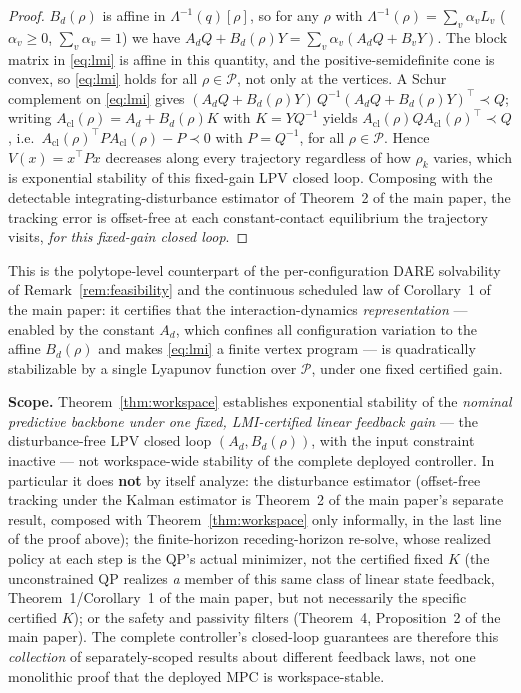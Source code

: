 \documentclass[journal]{IEEEtran}
\newcommand{\Laminv}{\Lambda^{-1}(q)}
\begin{document}
\begin{proof}
$B_d(\rho)$ is affine in $\Laminv[\rho]$, so for any $\rho$ with
$\Lambda^{-1}(\rho)=\sum_v\alpha_vL_v$ ($\alpha_v\ge0$,
$\sum_v\alpha_v=1$) we have
$A_dQ+B_d(\rho)Y=\sum_v\alpha_v(A_dQ+B_vY)$. The block matrix in
\eqref{eq:lmi} is affine in this quantity, and the positive-semidefinite
cone is convex, so \eqref{eq:lmi} holds for all $\rho\in\mathcal P$, not
only at the vertices. A Schur complement on \eqref{eq:lmi} gives
$(A_dQ+B_d(\rho)Y)\,Q^{-1}(A_dQ+B_d(\rho)Y)^\top\prec Q$; writing
$A_\text{cl}(\rho)=A_d+B_d(\rho)K$ with $K=YQ^{-1}$ yields
$A_\text{cl}(\rho)QA_\text{cl}(\rho)^\top\prec Q$, i.e.\
$A_\text{cl}(\rho)^\top PA_\text{cl}(\rho)-P\prec0$ with $P=Q^{-1}$, for
all $\rho\in\mathcal P$. Hence $V(x)=x^\top Px$ decreases along every
trajectory regardless of how $\rho_k$ varies, which is exponential
stability of this fixed-gain LPV closed loop. Composing with the
detectable integrating-disturbance estimator of Theorem~2 of the main
paper, the tracking error is offset-free at each constant-contact
equilibrium the trajectory visits, \emph{for this fixed-gain closed
loop}.
\end{proof}

This is the polytope-level counterpart of the per-configuration DARE
solvability of Remark~\ref{rem:feasibility} and the continuous scheduled
law of Corollary~1 of the main paper: it certifies that the
interaction-dynamics \emph{representation} --- enabled by the constant
$A_d$, which confines all configuration variation to the affine
$B_d(\rho)$ and makes \eqref{eq:lmi} a finite vertex program --- is
quadratically stabilizable by a single Lyapunov function over
$\mathcal P$, under one fixed certified gain.

\textbf{Scope.} Theorem~\ref{thm:workspace} establishes exponential
stability of the \emph{nominal predictive backbone under one fixed,
LMI-certified linear feedback gain} --- the disturbance-free LPV closed
loop $(A_d,B_d(\rho))$, with the input constraint inactive --- not
workspace-wide stability of the complete deployed controller. In
particular it does \textbf{not} by itself analyze: the disturbance
estimator (offset-free tracking under the Kalman estimator is Theorem~2
of the main paper's separate result, composed with
Theorem~\ref{thm:workspace} only informally, in the last line of the
proof above); the finite-horizon receding-horizon re-solve, whose
realized policy at each step is the QP's actual minimizer, not the
certified fixed $K$ (the unconstrained QP realizes \emph{a} member of
this same class of linear state feedback, Theorem~1/Corollary~1 of the
main paper, but not necessarily the specific certified $K$); or the
safety and passivity filters (Theorem~4, Proposition~2 of the main
paper). The complete controller's closed-loop guarantees are therefore
this \emph{collection} of separately-scoped results about different
feedback laws, not one monolithic proof that the deployed MPC is
workspace-stable.
\end{document}
